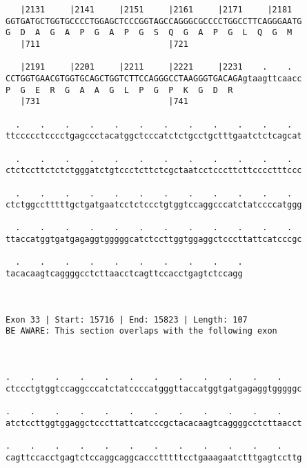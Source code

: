 \documentclass{article}
\begin{document}
\begin{Verbatim}
   |2131     |2141     |2151     |2161     |2171     |2181  
GGTGATGCTGGTGCCCCTGGAGCTCCCGGTAGCCAGGGCGCCCCTGGCCTTCAGGGAATG
G  D  A  G  A  P  G  A  P  G  S  Q  G  A  P  G  L  Q  G  M  
   |711                          |721                       
  
   |2191     |2201     |2211     |2221     |2231    .    .  
CCTGGTGAACGTGGTGCAGCTGGTCTTCCAGGGCCTAAGGGTGACAGAgtaagttcaacc
P  G  E  R  G  A  A  G  L  P  G  P  K  G  D  R              
   |731                          |741                       
  
  .    .    .    .    .    .    .    .    .    .    .    .  
ttccccctcccctgagccctacatggctcccatctctgcctgctttgaatctctcagcat
                                                            
  .    .    .    .    .    .    .    .    .    .    .    .  
ctctccttctctctgggatctgtccctcttctcgctaatcctcccttcttcccctttccc
                                                            
  .    .    .    .    .    .    .    .    .    .    .    .  
ctctggcctttttgctgatgaatcctctccctgtggtccaggcccatctatccccatggg
                                                            
  .    .    .    .    .    .    .    .    .    .    .    .  
ttaccatggtgatgagaggtgggggcatctccttggtggaggctcccttattcatcccgc
                                                            
  .    .    .    .    .    .    .    .    .    .
tacacaagtcaggggcctcttaacctcagttccacctgagtctccagg
                                                
                                                
 
Exon 33 | Start: 15716 | End: 15823 | Length: 107
BE AWARE: This section overlaps with the following exon



.    .    .    .    .    .    .    .    .    .    .    .    
ctccctgtggtccaggcccatctatccccatgggttaccatggtgatgagaggtgggggc
                                                            
.    .    .    .    .    .    .    .    .    .    .    .    
atctccttggtggaggctcccttattcatcccgctacacaagtcaggggcctcttaacct
                                                            
.    .    .    .    .    .    .    .    .    .    .    .    
cagttccacctgagtctccaggcaggcaccctttttcctgaaagaatctttgagtccttg
                                                            

\end{Verbatim}
\end{document}
